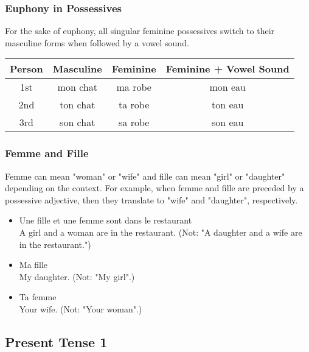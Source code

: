\subsubsection{Euphony in Possessives}

For the sake of euphony, all singular feminine possessives switch to their masculine forms when followed by a vowel sound.

\begin{center}\begin{tabular}{|c|c|c|c|}
\hline
\textbf{Person} & \textbf{Masculine} & \textbf{Feminine} & \textbf{Feminine + Vowel Sound} \\ \hline
1st             & mon chat           & ma robe           & mon eau                         \\ \hline
2nd             & ton chat           & ta robe           & ton eau                         \\ \hline
3rd             & son chat           & sa robe           & son eau                         \\ \hline
\end{tabular}\end{center}

\subsubsection{Femme and Fille}

Femme can mean "woman" or "wife" and fille can mean "girl" or "daughter" depending on the context. For example, when femme and fille are preceded by a possessive adjective, then they translate to "wife" and "daughter", respectively.

\begin{itemize}
  \item  Une fille et une femme sont dans le restaurant \\ A girl and a woman are in the restaurant. (Not: "A daughter and a wife are in the restaurant.")
  \item  Ma fille \\ My daughter. (Not: "My girl".)
  \item  Ta femme \\ Your wife. (Not: "Your woman".)
\end{itemize}


\pagebreak
\subsection{Present Tense 1}

